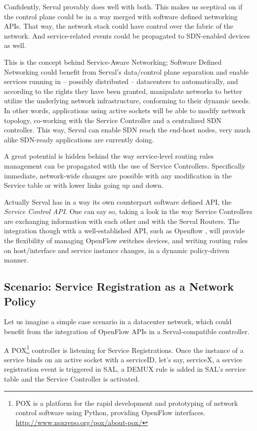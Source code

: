 Confidently, Serval provably does well with both.
This makes us sceptical on if the control plane could be in a way merged with software defined networking APIs.
That way, the network stack could have control over the fabric of the network.
And service-related events could be propagated to SDN-enabled devices as well.

This is the concept behind Service-Aware Networking; 
Software Defined Networking could benefit from Serval's data/control plane separation and enable services running in – possibly distributed – datacenters to automatically, and according to the rights they have been granted, manipulate networks to better utilize the underlying network infrastructure, conforming to their dynamic needs.
In other words, applications using active sockets will be able to modify network topology, co-working with the Service Controller and a centralized SDN controller.
This way, Serval can enable SDN reach the end-host nodes, very much alike SDN-ready applications are currently doing.

A great potential is hidden behind the way service-level routing rules management can be propagated with the use of Service Controllers.
Specifically immediate, network-wide changes are possible with any modification in the Service table or with lower links going up and down.

Actually Serval has in a way its own counterpart software defined API, the \emph{Service Control API}.
One can say so, taking a look in the way Service Controllers are exchanging information with each other and with the Serval Routers.
The integration though with a well-established API, such as Openflow \cite{McKeown2008}, will provide the flexibility of managing OpenFlow switches devices, and writing routing rules on host/interface and service instance changes, in a dynamic policy-driven manner.

\subsection{Scenario: Service Registration as a Network Policy}
Let us imagine a simple case scenario in a datacenter network, which could benefit from the integration of OpenFlow APIs in a Serval-compatible controller.

A POX\footnote{POX is a platform for the rapid development and prototyping of network control software using Python, providing OpenFlow interfaces.\\ \url{http://www.noxrepo.org/pox/about-pox/}} controller is listening for Service Registrations.
Once the instance of a service binds on an active socket with a serviceID, let's say, serviceX, a service registration event is triggered in SAL, a DEMUX rule is added in SAL's service table and the Service Controller is activated.

